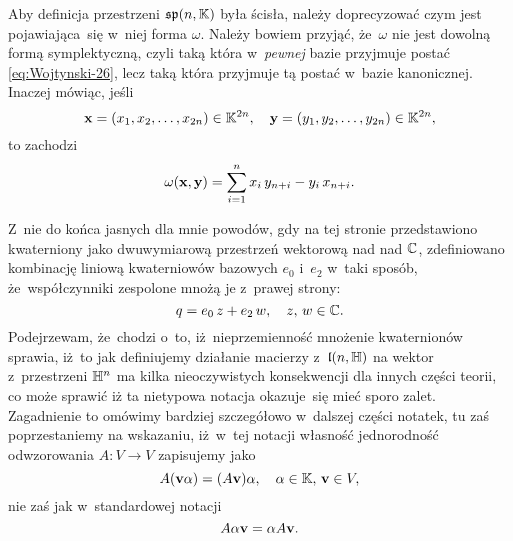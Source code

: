\documentclass[a4paper,11pt]{article}
\begin{document}
 Aby definicja przestrzeni $\mathfrak{sp}( n, \mathbb{K} )$ była
ścisła, należy doprecyzować czym jest pojawiająca~się w~niej forma $\omega$.
Należy bowiem przyjąć, że~$\omega$ nie jest dowolną formą symplektyczną, czyli
taką która w~\textit{pewnej} bazie przyjmuje postać
\eqref{eq:Wojtynski-26}, lecz taką która przyjmuje tą postać w~bazie
kanonicznej. Inaczej mówiąc, jeśli
\begin{equation}
  \label{eq:Wojtynski-30}
  \mathbf{x} = ( x_{ 1 }, x_{ 2 }, \ldots, x_{ 2n } ) \in \mathbb{K}^{ 2n }, \quad
  \mathbf{y} = ( y_{ 1 }, y_{ 2 }, \ldots, y_{ 2n } ) \in \mathbb{K}^{ 2n },
\end{equation}
to zachodzi
\begin{equation}
  \label{eq:Wojtynski-31}
  \omega( \mathbf{x}, \mathbf{y} ) =
  \sum_{ i = 1 }^{ n } x_{ i } \, y_{ n + i } - y_{ i } \, x_{ n + i }.
\end{equation}

\vspace{\spaceFour}





 Z~nie do końca jasnych dla mnie powodów, gdy na tej stronie
przedstawiono kwaterniony jako dwuwymiarową przestrzeń wektorową nad nad
$\mathbb{C}$, zdefiniowano kombinację liniową kwaterniowów bazowych $e_{ 0 }$
i~$e_{ 2 }$ w~taki sposób, że~współczynniki zespolone mnożą je z~prawej
strony:
\begin{equation}
  \label{eq:Wojtynski-32}
  q = e_{ 0 } \, z + e_{ 2 } \, w, \quad z, \, w \in \mathbb{C}.
\end{equation}
Podejrzewam, że~chodzi o~to, iż~nieprzemienność mnożenie kwaternionów
sprawia, iż~to jak definiujemy działanie macierzy z~$\mathfrak{l}( n, \mathbb{H} )$ na
wektor z~przestrzeni $\mathbb{H}^{ n }$ ma kilka nieoczywistych konsekwencji dla
innych części teorii, co może sprawić iż ta nietypowa notacja okazuje~się
mieć sporo zalet. Zagadnienie to omówimy bardziej szczegółowo w~dalszej
części notatek, tu zaś poprzestaniemy na wskazaniu, iż~w~tej notacji
własność jednorodność odwzorowania $A : V \to V$ zapisujemy jako
\begin{equation}
  \label{eq:Wojtynski-33}
  A ( \mathbf{v} \alpha ) = ( A \mathbf{v} ) \alpha, \quad
  \alpha \in \mathbb{K}, \, \mathbf{v} \in V,
\end{equation}
nie zaś jak w~standardowej notacji
\begin{equation}
  \label{eq:Wojtynski-34}
  A \alpha \mathbf{v} = \alpha A \mathbf{v}.
\end{equation}
\end{document}
